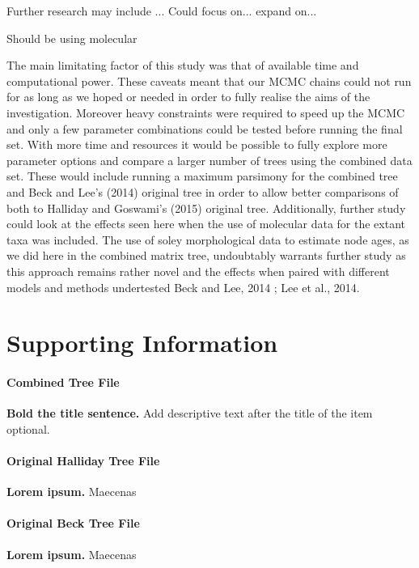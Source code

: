 \documentclass[11pt,letterpaper]{article}
\begin{document}
Further research may include ... Could focus on... expand on...

Should be using molecular \citep{puttick2016dating} 

The main limitating factor of this study was that of available time and computational power. These caveats meant that our MCMC chains could not run for as long as we hoped or needed in order to fully realise the aims of the investigation. Moreover heavy constraints were required to speed up the MCMC and only a few parameter combinations could be tested before running the final set. With more time and resources it would be possible to fully explore more parameter options and compare a larger number of trees using the combined data set. These would include running a maximum parsimony for the combined tree and Beck and Lee's (2014) original tree in order to allow better comparisons of both to Halliday and Goswami's (2015) original tree. Additionally, further study could look at the effects seen here when the use of molecular data for the extant taxa was included. The use of soley morphological data to estimate node ages, as we did here in the combined matrix tree, undoubtably warrants further study as this approach remains rather novel and the effects when paired with different models and methods undertested Beck and Lee, 2014 ;  Lee et al., 2014. 

\newpage


\section{Supporting Information}

\paragraph*{Combined Tree File}
\label{S1_Fig}
{\bf Bold the title sentence.} Add descriptive text after the title of the item optional.

\paragraph*{Original Halliday Tree File}
\label{S2_Fig}
{\bf Lorem ipsum.} Maecenas 

\paragraph*{Original Beck Tree File}
\label{S1_File}
{\bf Lorem ipsum.}  Maecenas 
\end{document}
